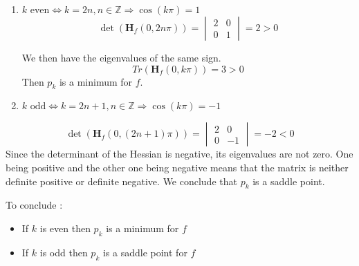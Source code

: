 \documentclass[../convex_optimization.tex]{subfiles}
\begin{document}
\begin{enumerate}
    \item $k\text{ even} \iff k=2n, n\in \mathbb Z \Rightarrow \cos(k\pi) = 1$
        \begin{equation}
            \det{(\mathbf H_f(0, 2n\pi))}=
            \begin{vmatrix}
                2  & 0\\
                0 &1
            \end{vmatrix} = 2>0\nonumber
        \end{equation}

We then have the eigenvalues of the same sign. 
\begin{equation}
    Tr(\mathbf H_f(0,k\pi)) = 3>0 \nonumber
\end{equation}
Then \(p_k\) is a minimum for $f$.

    \item $k\text{ odd} \iff k=2n+1, n\in \mathbb Z \Rightarrow \cos(k\pi) = -1$
\end{enumerate}
\begin{equation}
    \det{(\mathbf H_f(0, (2n+1)\pi))}=
    \begin{vmatrix}
        2  & 0\\
        0 & -1
    \end{vmatrix} = -2<0\nonumber
\end{equation}
Since the determinant of the Hessian is negative, its eigenvalues are not zero.
One being positive and the other one being negative means that the matrix is
neither definite positive or definite negative. We conclude that $p_k$ is a saddle point.

To conclude :
\begin{itemize}
    \item If $k$ is even then $p_k$ is a minimum for $f$
    \item If $k$ is odd then $p_k$ is a saddle point for $f$
\end{itemize}
\end{document}
